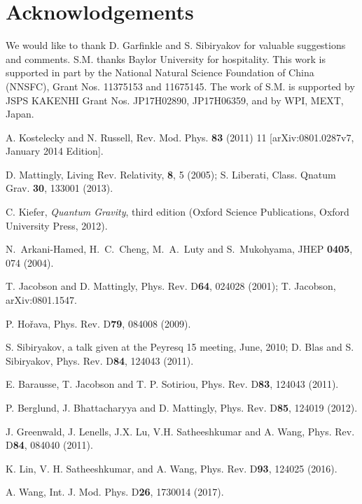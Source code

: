 \documentclass[aps,preprintnumbers,twocolumn,showpacs]{revtex4-1}
\begin{document}
 
\section*{Acknowlodgements}

We would like to thank D. Garfinkle and S. Sibiryakov for valuable suggestions and comments. S.M. thanks Baylor University for hospitality. 
This work is supported in part by   the National Natural Science Foundation of China (NNSFC), Grant Nos. 11375153 and 11675145. 
The work of S.M. is supported by JSPS KAKENHI Grant Nos. JP17H02890, JP17H06359, and by WPI, MEXT, Japan. 


\begin{thebibliography}{nbound}

  A. Kostelecky and N. Russell, Rev. Mod. Phys. {\bf 83} (2011) 11 [arXiv:0801.0287v7, January 2014 Edition].

  D. Mattingly,   Living Rev.  Relativity, {\bf 8}, 5 (2005); S. Liberati,   Class. Qnatum Grav. {\bf 30}, 133001 (2013).

 C. Kiefer, {\em Quantum Gravity}, third edition  (Oxford Science Publications, Oxford University Press, 2012).

  N.~Arkani-Hamed, H.~C.~Cheng, M.~A.~Luty and S.~Mukohyama, 
  JHEP {\bf 0405}, 074 (2004).
  
 T. Jacobson and D. Mattingly, Phys. Rev. D{\bf 64}, 024028 (2001); T. Jacobson, arXiv:0801.1547.

 P. Ho\v{r}ava,  Phys. Rev. D{\bf 79}, 084008 (2009).  

 
  S. Sibiryakov,  a talk given  at the Peyresq 15 meeting, June, 2010; 
                           D. Blas and S. Sibiryakov,  Phys. Rev. D{\bf 84}, 124043 (2011).

 E. Barausse, T. Jacobson and T. P. Sotiriou, Phys. Rev. D{\bf 83}, 124043 (2011).

  P. Berglund, J. Bhattacharyya and D. Mattingly, Phys. Rev. D{\bf 85}, 124019 (2012).

  J. Greenwald, J. Lenells, J.X. Lu, V.H. Satheeshkumar and A. Wang,   Phys. Rev. D{\bf 84}, 084040 (2011).

 K. Lin, V. H. Satheeshkumar, and A. Wang, Phys. Rev. D{\bf 93}, 124025 (2016).

 A. Wang, Int. J. Mod. Phys. D{\bf 26}, 1730014 (2017).


\end{thebibliography}
\end{document}
